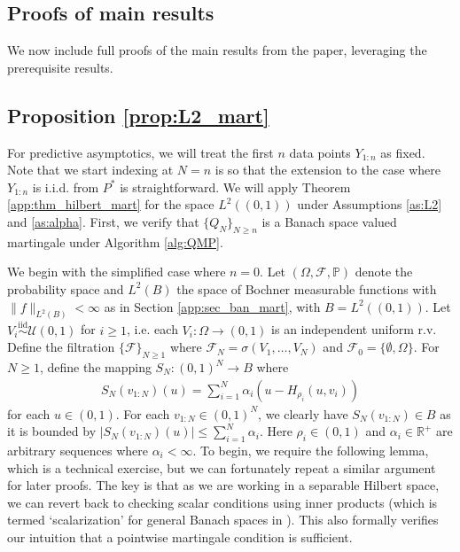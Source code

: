 \documentclass[11pt,a4paper]{article}
\newcommand{\iid}{\overset{\mathrm{iid}}{\sim}}
\newcommand{\R}{\mathbb{R}}
\renewcommand{\Pr}{\mathbb{P}}
\begin{document}
\begin{appendices}
\section{Proofs of main results}
We now include full proofs of the main results from the paper, leveraging the prerequisite results. 



\subsection{Proposition \ref{prop:L2_mart}}
For predictive asymptotics, we will treat the first $n$ data points $Y_{1:n}$ as fixed. Note that we start indexing at $N = n$ is so that the extension to the case where $Y_{1:n}$ is i.i.d. from $P^*$ is straightforward.
We will apply {Theorem \ref{app:thm_hilbert_mart}} for the space $L^2((0,1))$ under {Assumptions \ref{as:L2}} and {\ref{as:alpha}}. First, we verify that $\{Q_N\}_{N\geq n}$ is a Banach space valued martingale under {Algorithm \ref{alg:QMP}}. 

 We begin with the simplified case where $n = 0$. Let $(\Omega, \mathcal{F},\Pr)$ denote the probability space and $L^2(B)$ the space of Bochner measurable functions with $\|f\|_{L^2(B)} < \infty$ as in Section \ref{app:sec_ban_mart}, with $B = L^2((0,1))$. Let $V_i \iid \mathcal{U}(0,1)$ for $i \geq 1$, i.e. each $V_i:\Omega \to (0,1)$ is an independent uniform r.v. Define the filtration $\{\mathcal{F}\}_{N \geq 1}$ where $\mathcal{F}_N = \sigma(V_1,\ldots,V_N)$ and $\mathcal{F}_0 = \{\emptyset, \Omega\}$. For $N \geq 1$, define the mapping $S_N: (0,1)^N  \to B$ where
\begin{align}\label{app:eq_Snu}
    S_N(v_{1:N})(u) = \sum_{i = 1}^N \alpha_i (u - H_{\rho_i}(u,v_i))
\end{align}
for each $u \in (0,1)$. For each $v_{1:N} \in (0,1)^N$, we clearly have $S_N(v_{1:N}) \in B$ as it is bounded by $|S_N(v_{1:N})(u)| \leq \sum_{i = 1}^N \alpha_i$.
 Here $\rho_i \in (0,1)$ and $\alpha_i\in \R^+$ are arbitrary sequences where $\alpha_i <\infty$. To begin, we require the following lemma, which is a technical exercise, but we can fortunately repeat a similar argument for later proofs. The key is that as we are working in a separable Hilbert space, we can revert back to checking scalar conditions using inner products (which is termed `scalarization' for general Banach spaces in \cite{Pisier2016}). This also formally verifies our intuition that a pointwise martingale condition is sufficient.
 

\end{appendices}
\end{document}
